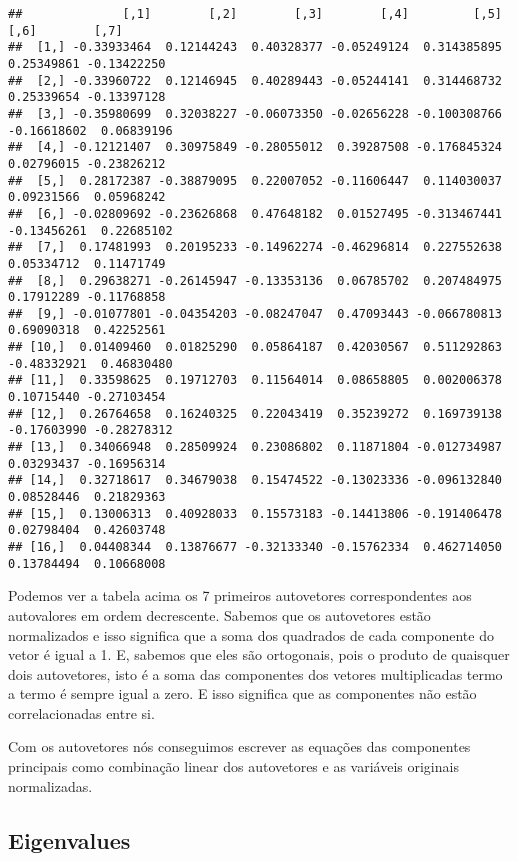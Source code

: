 \documentclass[
]{article}
\begin{document}
\begin{verbatim}
##              [,1]        [,2]        [,3]        [,4]         [,5]        [,6]        [,7]
##  [1,] -0.33933464  0.12144243  0.40328377 -0.05249124  0.314385895  0.25349861 -0.13422250
##  [2,] -0.33960722  0.12146945  0.40289443 -0.05244141  0.314468732  0.25339654 -0.13397128
##  [3,] -0.35980699  0.32038227 -0.06073350 -0.02656228 -0.100308766 -0.16618602  0.06839196
##  [4,] -0.12121407  0.30975849 -0.28055012  0.39287508 -0.176845324  0.02796015 -0.23826212
##  [5,]  0.28172387 -0.38879095  0.22007052 -0.11606447  0.114030037  0.09231566  0.05968242
##  [6,] -0.02809692 -0.23626868  0.47648182  0.01527495 -0.313467441 -0.13456261  0.22685102
##  [7,]  0.17481993  0.20195233 -0.14962274 -0.46296814  0.227552638  0.05334712  0.11471749
##  [8,]  0.29638271 -0.26145947 -0.13353136  0.06785702  0.207484975  0.17912289 -0.11768858
##  [9,] -0.01077801 -0.04354203 -0.08247047  0.47093443 -0.066780813  0.69090318  0.42252561
## [10,]  0.01409460  0.01825290  0.05864187  0.42030567  0.511292863 -0.48332921  0.46830480
## [11,]  0.33598625  0.19712703  0.11564014  0.08658805  0.002006378  0.10715440 -0.27103454
## [12,]  0.26764658  0.16240325  0.22043419  0.35239272  0.169739138 -0.17603990 -0.28278312
## [13,]  0.34066948  0.28509924  0.23086802  0.11871804 -0.012734987  0.03293437 -0.16956314
## [14,]  0.32718617  0.34679038  0.15474522 -0.13023336 -0.096132840  0.08528446  0.21829363
## [15,]  0.13006313  0.40928033  0.15573183 -0.14413806 -0.191406478  0.02798404  0.42603748
## [16,]  0.04408344  0.13876677 -0.32133340 -0.15762334  0.462714050  0.13784494  0.10668008
\end{verbatim}

Podemos ver a tabela acima os 7 primeiros autovetores correspondentes aos autovalores em ordem decrescente. Sabemos que os autovetores estão normalizados e isso significa que a soma dos quadrados de cada componente do vetor é igual a 1. E, sabemos que eles são ortogonais, pois o produto de quaisquer dois autovetores, isto é a soma das componentes dos vetores multiplicadas termo a termo é sempre igual a zero. E isso significa que as componentes não estão correlacionadas entre si.

Com os autovetores nós conseguimos escrever as equações das componentes principais como combinação linear dos autovetores e as variáveis originais normalizadas.

\hypertarget{eigenvalues}{%
\subsection{Eigenvalues}\label{eigenvalues}}
\end{document}
